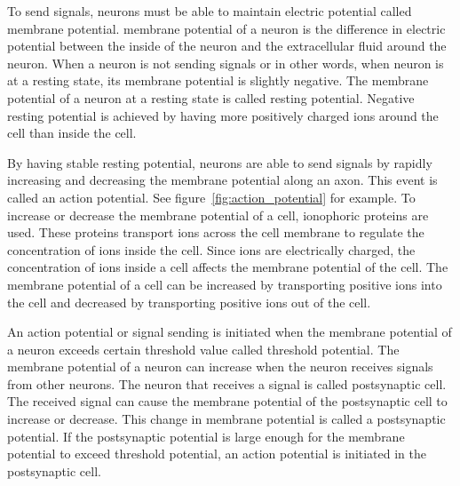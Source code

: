 To send signals, \glspl{neuron} must be able to maintain electric potential called \gls{membrane potential}. \Gls{membrane potential} of a \gls{neuron} is the difference in electric potential between the inside of the \gls{neuron} and the extracellular fluid around the \gls{neuron}. When a \gls{neuron} is not sending signals or in other words, when neuron is at a \gls{resting state}, its \gls{membrane potential} is slightly negative. The \gls{membrane potential} of a \gls{neuron} at a \gls{resting state} is called \gls{resting potential}. Negative \gls{resting potential} is achieved by having more positively charged ions around the cell than inside the cell.

By having stable \gls{resting potential}, \glspl{neuron} are able to send signals by rapidly increasing and decreasing the \gls{membrane potential} along an \gls{axon}. This event is called an \gls{action potential}. See figure~\ref{fig:action_potential} for example. To increase or decrease the \gls{membrane potential} of a cell, \glspl{ionophoric protein} are used. These proteins transport ions across the cell membrane to regulate the concentration of ions inside the cell. Since ions are electrically charged, the concentration of ions inside a cell affects the \gls{membrane potential} of the cell. The \gls{membrane potential} of a cell can be increased by transporting positive ions into the cell and decreased by transporting positive ions out of the cell. 

An \gls{action potential} or signal sending is initiated when the \gls{membrane potential} of a \gls{neuron} exceeds certain threshold value called \gls{threshold potential}. The \gls{membrane potential} of a \gls{neuron} can increase when the \gls{neuron} receives signals from other \glspl{neuron}. The \gls{neuron} that receives a signal is called \gls{postsynaptic cell}. The received signal can cause the \gls{membrane potential} of the \gls{postsynaptic cell} to increase or decrease. This change in \gls{membrane potential} is called a \gls{postsynaptic potential}. If the \gls{postsynaptic potential} is large enough for the \gls{membrane potential} to exceed \gls{threshold potential}, an \gls{action potential} is initiated in the \gls{postsynaptic cell}.


